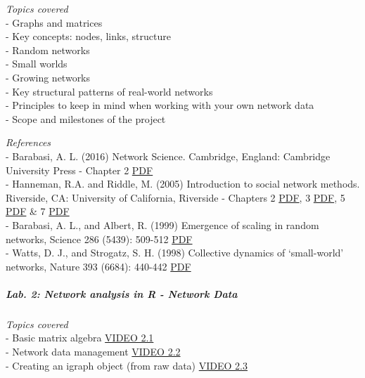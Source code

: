 \documentclass[
]{article}
\begin{document}
\emph{Topics covered}\\
- Graphs and matrices\\
- Key concepts: nodes, links, structure\\
- Random networks\\
- Small worlds\\
- Growing networks\\
- Key structural patterns of real-world networks\\
- Principles to keep in mind when working with your own network data\\
- Scope and milestones of the project

\emph{References}\\
- Barabasi, A. L. (2016) Network Science. Cambridge, England: Cambridge
University Press - Chapter 2
\href{http://networksciencebook.com/chapter/2}{PDF}\\
- Hanneman, R.A. and Riddle, M. (2005) Introduction to social network
methods. Riverside, CA: University of California, Riverside - Chapters 2
\href{http://faculty.ucr.edu/~hanneman/nettext/C2_Formal_Methods.html}{PDF},
3 \href{http://faculty.ucr.edu/~hanneman/nettext/C3_Graphs.html}{PDF}, 5
\href{http://faculty.ucr.edu/~hanneman/nettext/C5_\%20Matrices.html}{PDF}
\& 7
\href{http://faculty.ucr.edu/~hanneman/nettext/C7_Connection.html}{PDF}\\
- Barabasi, A. L., and Albert, R. (1999) Emergence of scaling in random
networks, Science 286 (5439): 509-512
\href{https://2c2e773f-85c0-4039-818c-ea517fc75085.filesusr.com/ugd/c5611b_0f8a62d4615e4821859c249a3a0802af.pdf}{PDF}\\
- Watts, D. J., and Strogatz, S. H. (1998) Collective dynamics of
`small-world' networks, Nature 393 (6684): 440-442
\href{https://2c2e773f-85c0-4039-818c-ea517fc75085.filesusr.com/ugd/c5611b_a47348d589f943d38faf71c2c1769b79.pdf}{PDF}

\hypertarget{lab.-2-network-analysis-in-r---network-data}{%
\subparagraph{\texorpdfstring{\textbf{Lab. 2: Network analysis in R -
Network
Data}}{Lab. 2: Network analysis in R - Network Data}}\label{lab.-2-network-analysis-in-r---network-data}}

\emph{Topics covered}\\
- Basic matrix algebra
\href{https://www.youtube.com/watch?v=cac1yqxxwWM\&feature=youtu.be}{VIDEO
2.1}\\
- Network data management
\href{https://www.youtube.com/watch?v=TAojsuvZRsI\&feature=youtu.be}{VIDEO
2.2}\\
- Creating an igraph object (from raw data)
\href{https://www.youtube.com/watch?v=gRkCgIejXCI}{VIDEO 2.3}
\end{document}
